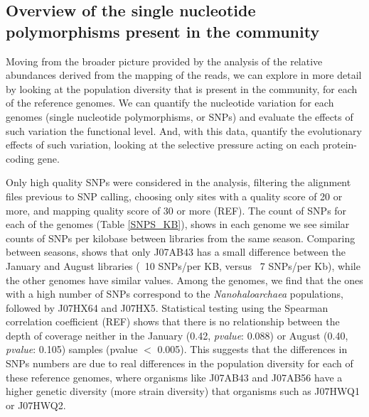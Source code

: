 

\clearpage
\subsection{Overview of the single nucleotide polymorphisms present in the community}

Moving from the broader picture provided by the analysis of the relative abundances derived from the mapping of the reads, we can explore in more detail by looking at the population diversity that is present in the community, for each of the reference genomes. We can quantify the nucleotide variation for each genomes (single nucleotide polymorphisms, or SNPs) and evaluate the effects of such variation the functional level. And, with this data, quantify the evolutionary effects of such variation, looking at the selective pressure acting on each protein-coding gene.

Only high quality SNPs were considered in the analysis, filtering the alignment files previous to SNP calling, choosing only sites with a quality score of 20 or more, and mapping quality score of 30 or more (REF). The count of SNPs for each of the genomes (Table \ref{SNPS_KB}), shows in each genome we see similar counts of SNPs per kilobase between libraries from the same season. Comparing between seasons, shows that only J07AB43 has a small difference between the January and August libraries (~10 SNPs/per KB, versus ~7 SNPs/per Kb), while the other genomes have similar values. Among the genomes, we find that the ones with a high number of SNPs correspond to the \textit{Nanohaloarchaea} populations, followed by J07HX64 and J07HX5. Statistical testing using the Spearman correlation coefficient (REF) shows that there is no relationship between the depth of coverage neither in the January (0.42, \textit{pvalue}: 0.088) or August (0.40, \textit{pvalue}: 0.105) samples (pvalue $<$ 0.005). This suggests that the differences in SNPs numbers are due to real differences in the population diversity for each of these reference genomes, where organisms like J07AB43 and J07AB56 have a higher genetic diversity (more strain diversity) that organisms such as J07HWQ1 or J07HWQ2.

